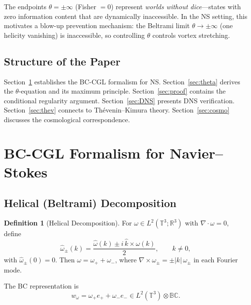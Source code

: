 \documentclass[12pt,a4paper]{article}
\theoremstyle{definition}
\newtheorem{definition}[theorem]{Definition}
\newcommand{\BC}{\mathbb{BC}}
\newcommand{\R}{\mathbb{R}}
\newcommand{\T}{\mathbb{T}}
\begin{document}
The endpoints $\theta = \pm\infty$ (Fisher $= 0$) represent \emph{worlds without dice}---states with zero information content that are dynamically inaccessible. In the NS setting, this motivates a blow-up prevention mechanism: the Beltrami limit $\theta \to \pm\infty$ (one helicity vanishing) is inaccessible, so controlling $\theta$ controls vortex stretching.

\subsection{Structure of the Paper}

Section~\ref{sec:BC} establishes the BC-CGL formalism for NS. Section~\ref{sec:theta} derives the $\theta$-equation and its maximum principle. Section~\ref{sec:proof} contains the conditional regularity argument. Section~\ref{sec:DNS} presents DNS verification. Section~\ref{sec:thev} connects to Th\'evenin--Kimura theory. Section~\ref{sec:cosmo} discusses the cosmological correspondence.

\section{BC-CGL Formalism for Navier--Stokes}\label{sec:BC}

\subsection{Helical (Beltrami) Decomposition}

\begin{definition}[Helical Decomposition]
For $\omega \in L^2(\T^3; \R^3)$ with $\nabla \cdot \omega = 0$, define
\begin{equation}\label{eq:helical}
  \hat{\omega}_\pm(k) = \frac{\hat{\omega}(k) \pm i\,\hat{k} \times \hat{\omega}(k)}{2}, \qquad k \neq 0,
\end{equation}
with $\hat{\omega}_\pm(0) = 0$. Then $\omega = \omega_+ + \omega_-$, where $\nabla \times \omega_\pm = \pm |k|\,\omega_\pm$ in each Fourier mode.
\end{definition}

The BC representation is
\begin{equation}
  w_\omega = \omega_+ e_+ + \omega_- e_- \in L^2(\T^3) \otimes \BC.
\end{equation}
\end{document}
